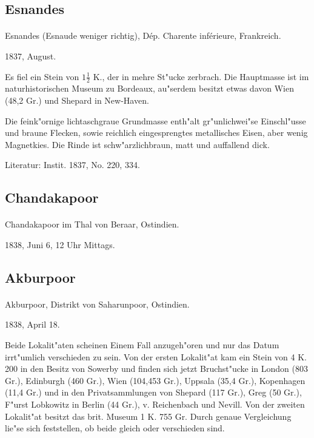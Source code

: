 \documentclass[a4paper, 11pt, oneside]{article}
\begin{document}
\subsection{Esnandes}
\normalsize
\paragraph{}
Esnandes (Esnaude weniger richtig), Dép. Charente inférieure, Frankreich.

1837, August.

Es fiel ein Stein von $1\frac{1}{2}$ K., der in mehre St"ucke zerbrach. Die Hauptmasse ist im naturhistorischen Museum zu Bordeaux, au"serdem besitzt etwas davon Wien (48,2 Gr.) und Shepard in New-Haven.

Die feink"ornige lichtaschgraue Grundmasse enth"alt gr"unlichwei"se Einschl"usse und braune Flecken, sowie reichlich eingesprengtes metallisches Eisen, aber wenig Magnetkies. Die Rinde ist schw"arzlichbraun, matt und auffallend dick.

\footnotesize
Literatur: Instit. 1837, No. 220, 334.

\subsection{Chandakapoor}
\normalsize
\paragraph{}
Chandakapoor im Thal von Beraar, Ostindien.

1838, Juni 6, 12 Uhr Mittags.

\subsection{Akburpoor}
\normalsize
\paragraph{}
Akburpoor, Distrikt von Saharunpoor, Ostindien.

1838, April 18.

Beide Lokalit"aten scheinen Einem Fall anzugeh"oren und nur das Datum irrt"umlich verschieden zu sein. Von der ersten Lokalit"at kam ein Stein von 4 K. 200 in den Besitz von Sowerby und finden sich jetzt Bruchst"ucke in London (803 Gr.), Edinburgh (460 Gr.), Wien (104,453 Gr.), Uppsala (35,4 Gr.), Kopenhagen (11,4 Gr.) und in den Privatsammlungen von Shepard (117 Gr.), Greg (50 Gr.), F"urst Lobkowitz in Berlin (44 Gr.), v. Reichenbach und Nevill. Von der zweiten Lokalit"at besitzt das brit. Museum 1 K. 755 Gr. Durch genaue Vergleichung lie"se sich feststellen, ob beide gleich oder verschieden sind.
\end{document}
